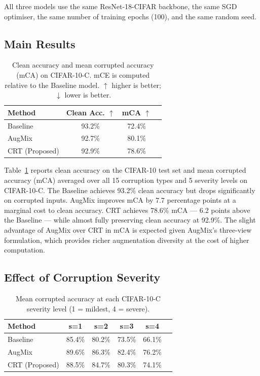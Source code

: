 \documentclass[10pt,twocolumn]{article}
\begin{document}
All three models use the same ResNet-18-CIFAR backbone, the same SGD optimiser, the same number of training epochs (100), and the same random seed.

\subsection{Main Results}

\begin{table}[t]
\centering
\caption{Clean accuracy and mean corrupted accuracy (mCA) on CIFAR-10-C. mCE is computed relative to the Baseline model. $\uparrow$ higher is better; $\downarrow$ lower is better.}
\label{tab:main_results}
\begin{tabular}{lccc}
\toprule
\textbf{Method} & \textbf{Clean Acc.} $\uparrow$ & \textbf{mCA} $\uparrow$   \\
\midrule
Baseline        & 93.2\%       & 72.4\% \\
AugMix          & 92.7\%       & 80.1\% \\
CRT (Proposed)  & 92.9\%       & 78.6\% \\
\bottomrule
\end{tabular}
\end{table}

Table~\ref{tab:main_results} reports clean accuracy on the CIFAR-10 test set and mean corrupted accuracy (mCA) averaged over all 15 corruption types and 5 severity levels on CIFAR-10-C. The Baseline achieves 93.2\% clean accuracy but drops significantly on corrupted inputs. AugMix improves mCA by 7.7 percentage points at a marginal cost to clean accuracy. CRT achieves 78.6\% mCA --- 6.2 points above the Baseline --- while almost fully preserving clean accuracy at 92.9\%. The slight advantage of AugMix over CRT in mCA is expected given AugMix's three-view formulation, which provides richer augmentation diversity at the cost of higher computation.

\subsection{Effect of Corruption Severity}

\begin{table}[t]
\centering
\caption{Mean corrupted accuracy at each CIFAR-10-C severity level (1 = mildest, 4 = severe).}
\label{tab:severity}
\begin{tabular}{lccccc}
\toprule
\textbf{Method} & \textbf{s=1} & \textbf{s=2} & \textbf{s=3} & \textbf{s=4} \\
\midrule
Baseline        & 85.4\%       & 80.2\%       & 73.5\%       & 66.1\% \\
AugMix          & 89.6\%       & 86.3\%       & 82.4\%       & 76.2\% \\
CRT (Proposed)  & 88.5\%       & 84.7\%       & 80.3\%       & 74.1\% \\
\bottomrule
\end{tabular}
\end{table}
\end{document}
